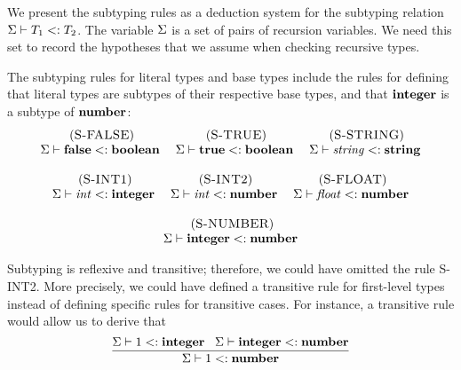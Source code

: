 We present the subtyping rules as a deduction system for the
subtyping relation $\Sigma \vdash T_{1} <: T_{2}$.
The variable $\Sigma$ is a set of pairs of recursion variables.
We need this set to record the hypotheses that we assume when checking
recursive types.

The subtyping rules for literal types and base types include the rules
for defining that literal types are subtypes of their respective base types,
and that $\mathbf{integer}$ is a subtype of $\mathbf{number}$:
\[
\begin{array}{c}
\begin{array}{c}
\; (\textsc{S-FALSE})\\
\Sigma \vdash \mathbf{false} <: \mathbf{boolean}
\end{array}
\;
\begin{array}{c}
\; (\textsc{S-TRUE})\\
\Sigma \vdash \mathbf{true} <: \mathbf{boolean}
\end{array}
\;
\begin{array}{c}
\; (\textsc{S-STRING})\\
\Sigma \vdash {\it string} <: \mathbf{string}
\end{array}
\\ \\
\begin{array}{c}
\; (\textsc{S-INT1})\\
\Sigma \vdash {\it int} <: \mathbf{integer}
\end{array}
\;
\begin{array}{c}
\; (\textsc{S-INT2})\\
\Sigma \vdash {\it int} <: \mathbf{number}
\end{array}
\;
\begin{array}{c}
\; (\textsc{S-FLOAT})\\
\Sigma \vdash {\it float} <: \mathbf{number}
\end{array}
\\ \\
\begin{array}{c}
\; (\textsc{S-NUMBER})\\
\Sigma \vdash \mathbf{integer} <: \mathbf{number}
\end{array}
\end{array}
\]

Subtyping is reflexive and transitive;
therefore, we could have omitted the rule \textsc{S-INT2}.
More precisely, we could have defined a transitive rule for first-level
types instead of defining specific rules for transitive cases.
For instance, a transitive rule would allow us to derive that
\[
\dfrac{\Sigma \vdash 1 <: \mathbf{integer} \;\;\;
       \Sigma \vdash \mathbf{integer} <: \mathbf{number}}
      {\Sigma \vdash 1 <: \mathbf{number}}
\]

